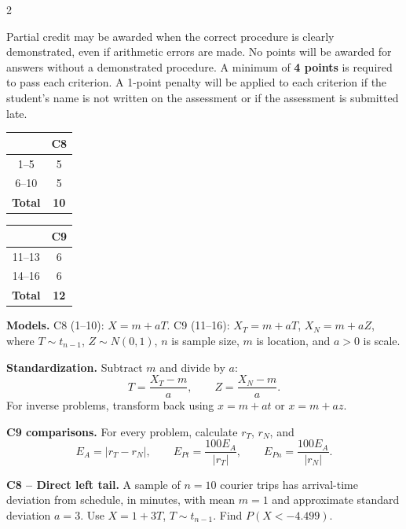 \begin{multicols}{2}

Partial credit may be awarded when the correct procedure is clearly demonstrated, even if arithmetic errors are made. No points will be awarded for answers without a demonstrated procedure. A minimum of \textbf{4 points} is required to pass each criterion. A 1-point penalty will be applied to each criterion if the student's name is not written on the assessment or if the assessment is submitted late.

\vspace{-4mm}
\begin{center}
	\begin{tabular}{|c|c|}
		\hline
		\textbf{\textnumero} & \textbf{C8} \\ \hline
		1--5 & 5 \\ \hline
		6--10 & 5 \\ \hline
		\textbf{Total} & \textbf{10} \\ \hline
	\end{tabular}
	\hspace{1cm}
	\begin{tabular}{|c|c|}
		\hline
		\textbf{\textnumero} & \textbf{C9} \\ \hline
		11--13 & 6 \\ \hline
		14--16 & 6 \\ \hline
		\textbf{Total} & \textbf{12} \\ \hline
	\end{tabular}
\end{center}
\vspace{-4mm}




\textbf{Models.} C8 (1--10): $X=m+aT$.
C9 (11--16): $X_T=m+aT$, $X_N=m+aZ$, where
$T\sim t_{n-1}$, $Z\sim N(0,1)$, $n$ is sample size,
$m$ is location, and $a>0$ is scale.

\textbf{Standardization.} Subtract $m$ and divide by $a$:
\[
T=\frac{X_T-m}{a},\qquad Z=\frac{X_N-m}{a}.
\]
For inverse problems, transform back using
$x=m+at$ or $x=m+az$.

\textbf{C9 comparisons.} For every problem, calculate
$r_T$, $r_N$, and
\[
E_A=|r_T-r_N|,\qquad
E_{Pt}=\frac{100E_A}{|r_T|},\qquad
E_{Pn}=\frac{100E_A}{|r_N|}.
\]


\textbf{C8 -- Direct left tail.} A sample of $n=10$ courier trips has arrival-time deviation from schedule, in minutes, with mean $m=1$ and approximate standard deviation $a=3$. Use $X=1+3T$, $T\sim t_{n-1}$.
Find $P(X<-4.499)$. 


\end{multicols}
